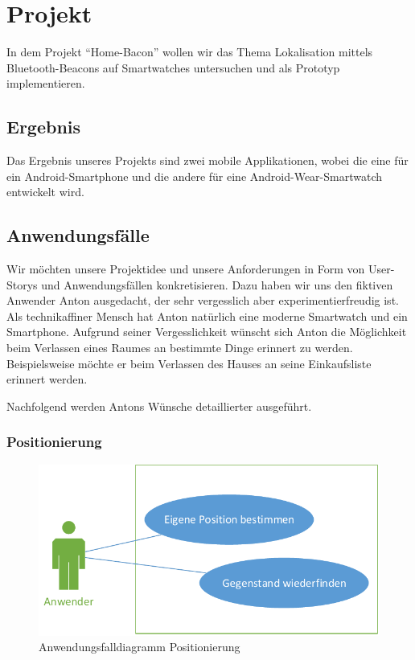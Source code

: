 \section{Projekt}

In dem Projekt "`Home-Bacon"' wollen wir das Thema Lokalisation mittels Bluetooth-Beacons auf Smartwatches untersuchen und als Prototyp implementieren.

\subsection{Ergebnis}
Das Ergebnis unseres Projekts sind zwei mobile Applikationen, wobei die eine für ein Android-Smartphone und die andere für eine Android-Wear-Smartwatch entwickelt wird.

\subsection{Anwendungsfälle}
\label{sec:useCases}
Wir möchten unsere Projektidee und unsere Anforderungen in Form von User-Storys und Anwendungsfällen konkretisieren. Dazu haben wir uns den fiktiven Anwender Anton ausgedacht, der sehr vergesslich aber experimentierfreudig ist. Als technikaffiner Mensch hat Anton natürlich eine moderne Smartwatch und ein Smartphone. Aufgrund seiner Vergesslichkeit wünscht sich Anton die Möglichkeit beim Verlassen eines Raumes an bestimmte Dinge erinnert zu werden. Beispielsweise möchte er beim Verlassen des Hauses an seine Einkaufsliste erinnert werden.

Nachfolgend werden Antons Wünsche detaillierter ausgeführt.

\subsubsection{Positionierung}
\begin{figure}[H]
\centering
\includegraphics[width=0.7\linewidth]{Bilder/UseCase-Position}
\caption{Anwendungsfalldiagramm Positionierung}
\label{fig:UseCase-Position}
\end{figure}

